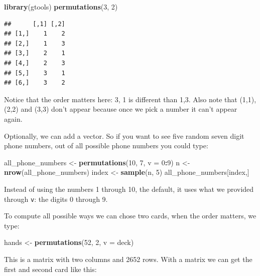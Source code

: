 \documentclass[
  openany]{book}
\newenvironment{Shaded}{\begin{snugshade}}{\end{snugshade}}
\newcommand{\DataTypeTok}[1]{\textcolor[rgb]{0.13,0.29,0.53}{#1}}
\newcommand{\DecValTok}[1]{\textcolor[rgb]{0.00,0.00,0.81}{#1}}
\newcommand{\KeywordTok}[1]{\textcolor[rgb]{0.13,0.29,0.53}{\textbf{#1}}}
\newcommand{\NormalTok}[1]{#1}
\newcommand{\OperatorTok}[1]{\textcolor[rgb]{0.81,0.36,0.00}{\textbf{#1}}}
\newcommand{\StringTok}[1]{\textcolor[rgb]{0.31,0.60,0.02}{#1}}
\begin{document}
\begin{Shaded}
\begin{Highlighting}[]
\KeywordTok{library}\NormalTok{(gtools)}
\KeywordTok{permutations}\NormalTok{(}\DecValTok{3}\NormalTok{, }\DecValTok{2}\NormalTok{)}
\end{Highlighting}
\end{Shaded}

\begin{verbatim}
##      [,1] [,2]
## [1,]    1    2
## [2,]    1    3
## [3,]    2    1
## [4,]    2    3
## [5,]    3    1
## [6,]    3    2
\end{verbatim}

Notice that the order matters here: 3, 1 is different than 1,3. Also note that (1,1), (2,2) and (3,3) don't appear because once we pick a number it can't appear again.

Optionally, we can add a vector. So if you want to see five random seven digit phone numbers, out of all possible phone numbers you could type:

\begin{Shaded}
\begin{Highlighting}[]
\NormalTok{all_phone_numbers <-}\StringTok{ }\KeywordTok{permutations}\NormalTok{(}\DecValTok{10}\NormalTok{, }\DecValTok{7}\NormalTok{, }\DataTypeTok{v =} \DecValTok{0}\OperatorTok{:}\DecValTok{9}\NormalTok{)}
\NormalTok{n <-}\StringTok{ }\KeywordTok{nrow}\NormalTok{(all_phone_numbers)}
\NormalTok{index <-}\StringTok{ }\KeywordTok{sample}\NormalTok{(n, }\DecValTok{5}\NormalTok{)}
\NormalTok{all_phone_numbers[index,]}
\end{Highlighting}
\end{Shaded}

Instead of using the numbers 1 through 10, the default, it uses what we provided through \texttt{v}: the digits 0 through 9.

To compute all possible ways we can chose two cards, when the order matters, we type:

\begin{Shaded}
\begin{Highlighting}[]
\NormalTok{hands <-}\StringTok{ }\KeywordTok{permutations}\NormalTok{(}\DecValTok{52}\NormalTok{, }\DecValTok{2}\NormalTok{, }\DataTypeTok{v =}\NormalTok{ deck)}
\end{Highlighting}
\end{Shaded}

This is a matrix with two columns and 2652 rows. With a matrix we can get the first and second card like this:
\end{document}
